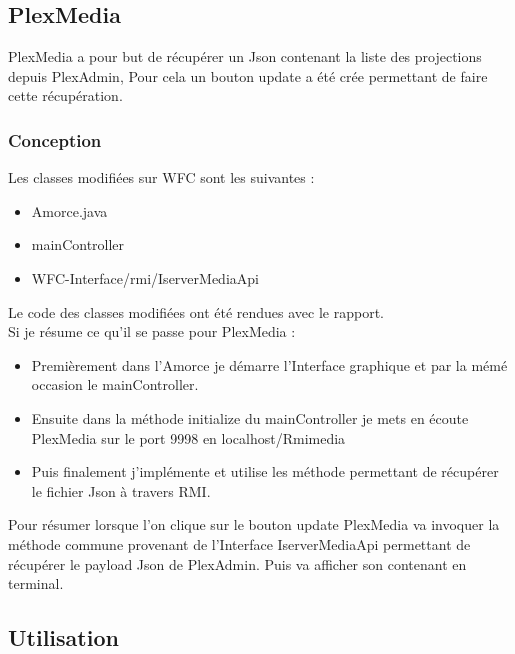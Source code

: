 \documentclass[a4paper]{article}
\begin{document}
\subsection{PlexMedia}
PlexMedia a pour but de récupérer un Json contenant la liste des projections depuis PlexAdmin, Pour cela un bouton update a été crée permettant de faire cette récupération.

\subsubsection{Conception}
Les classes modifiées sur WFC sont les suivantes :
\begin{itemize}
 \item Amorce.java
 \item mainController
 \item WFC-Interface/rmi/IserverMediaApi
\end{itemize}

Le code des classes modifiées ont été rendues avec le rapport.\\

Si je résume ce qu'il se passe pour PlexMedia : 
\begin{itemize}
 \item Premièrement dans l'Amorce je démarre l'Interface graphique et par la mémé occasion le mainController.
 \item Ensuite dans la méthode initialize du mainController je mets en écoute PlexMedia sur le port 9998 en localhost/Rmimedia
 \item Puis finalement j'implémente et utilise les méthode permettant de récupérer le fichier Json à travers RMI.
\end{itemize}

Pour résumer lorsque l'on clique sur le bouton update PlexMedia va invoquer la méthode commune provenant de l'Interface IserverMediaApi permettant de récupérer le payload Json de PlexAdmin.
Puis va afficher son contenant en terminal.


\subsection{Utilisation}
\end{document}
